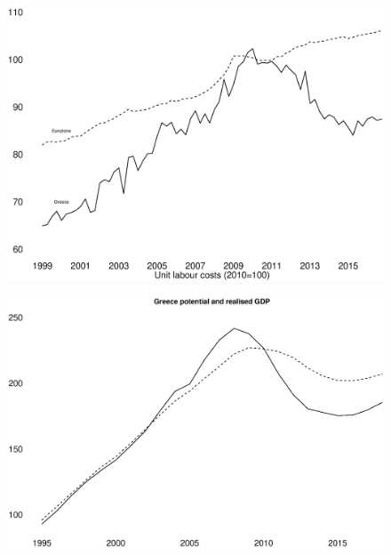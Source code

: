 \documentclass{beamer}
\begin{document}
\begin{frame}
  \begin{figure}
    \includegraphics[scale=.3]{greece4.eps}
  \end{figure}
\end{frame}

\begin{frame}
  \begin{figure}
    \includegraphics[scale=.3]{greece5.eps}
  \end{figure}
\end{frame}
\end{document}
